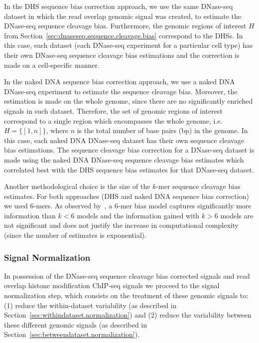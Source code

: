 In the DHS sequence bias correction approach, we use the same DNase-seq dataset in which the read overlap genomic signal was created, to estimate the DNase-seq sequence cleavage bias. Furthermore, the genomic regions of interest $H$ from Section~\ref{sec:dnaseseq.sequence.cleavage.bias} correspond to the DHSs. In this case, each dataset (each DNase-seq experiment for a particular cell type) has their own DNase-seq sequence cleavage bias estimations and the correction is made on a cell-specific manner.

In the naked DNA sequence bias correction approach, we use a naked DNA DNase-seq experiment to estimate the sequence cleavage bias. Moreover, the estimation is made on the whole genome, since there are no significantly enriched signals in such dataset. Therefore, the set of genomic regions of interest correspond to a single region which encompasses the whole genome, i.e. $H = \{ [1,n] \}$, where $n$ is the total number of base pairs (bp) in the genome. In this case, each naked DNA DNase-seq dataset has their own sequence cleavage bias estimations. The sequence cleavage bias correction for a DNase-seq dataset is made using the naked DNA DNase-seq sequence cleavage bias estimates which correlated best with the DHS sequence bias estimates for that DNase-seq dataset.

Another methodological choice is the size of the $k$-mer sequence cleavage bias estimates. For both approaches (DHS and naked DNA sequence bias correction) we used $6$-mers. As observed by~\cite{he2014}, a $6$-mer bias model captures significantly more information than $k < 6$ models and the information gained with $k > 6$ models are not significant and does not justify the increase in computational complexity (since the number of estimates is exponential).

\subsubsection{Signal Normalization}

In possession of the DNase-seq sequence cleavage bias corrected signals and read overlap histone modification ChIP-seq signals we proceed to the signal normalization step, which consists on the treatment of these genomic signals to: (1) reduce the within-dataset variability (as described in Section~\ref{sec:withindataset.normalization}) and (2) reduce the variability between these different genomic signals (as described in Section~\ref{sec:betweendataset.normalization}).

